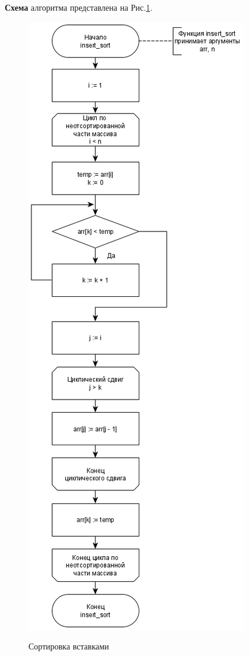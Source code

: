 \textbf{Схема} алгоритма представлена на Рис.\ref{fig2:image}.
\begin{figure}[pt!]
	\begin{center}
		{\includegraphics[scale = 0.57]{schemes/insert}}
		\caption{Сортировка вставками}
		\label{fig2:image}
	\end{center}
\end{figure}
\newpage

